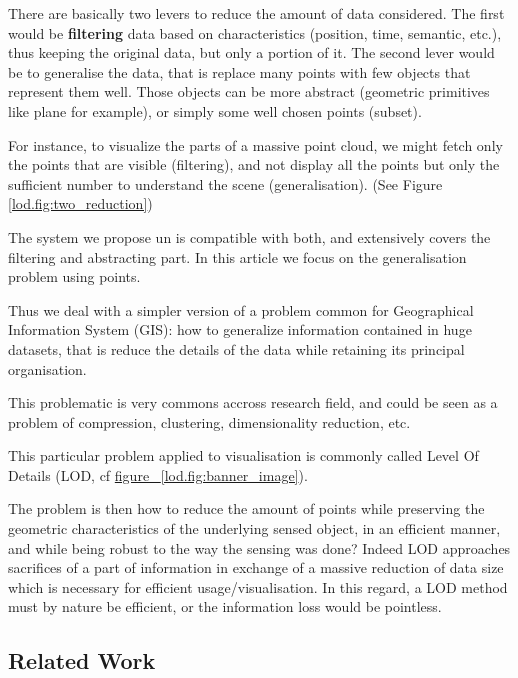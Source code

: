 		There are basically two levers to reduce the amount of data considered. The first would be \textbf{filtering} data based on characteristics (position, time, semantic, etc.), thus keeping the original data, but only a portion of it.
		The second lever would be to generalise the data, that is replace many points with few objects that represent them well. Those objects can be more abstract (geometric primitives like plane for example), or simply some well chosen points (subset).
		
		For instance, to visualize the parts of a massive point cloud, we might fetch only the points that are visible (filtering),
		and not display all the points but only the sufficient number to understand the scene (generalisation).
		(See Figure \ref{lod.fig:two_reduction})
		
		The system we propose un \cite{cura2015} is compatible with both, and extensively covers the filtering and abstracting part. In this article we focus on the generalisation problem using points.
		
		Thus we deal with a simpler version of a problem common for Geographical Information System (GIS): how to generalize information contained in huge datasets, that is reduce the details of the data while retaining its principal organisation.
		 
		This problematic is very commons accross research field, and could be seen as a problem of compression, clustering, dimensionality reduction, etc.
	  
		This particular problem applied to visualisation is commonly called Level Of Details (LOD, cf \href{lod.banner_image}{figure ~\ref{lod.fig:banner_image}}).
		
		The problem is then how to reduce the amount of points while preserving the geometric characteristics of the underlying sensed object, in an efficient manner, and while being robust to the way the sensing was done?
		Indeed LOD approaches sacrifices of a part of information in exchange of a massive reduction of data size which is necessary for efficient usage/visualisation. In this regard, a LOD method must by nature be efficient, or the information loss would be pointless.
		
		

	\subsection{Related Work} 
		
